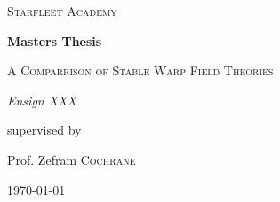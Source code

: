 \begin{titlepage}
	\centering
	{\scshape\Large Starfleet Academy \par}
	\vspace{2cm}
	{\huge\bfseries Masters Thesis\par}
	\vspace{1.5cm}
	{\scshape\Large A Comparrison of Stable Warp Field Theories \par}
	\vspace{1.5cm}
	{\scshape\Large  \par}
	\vspace{2cm}
	{\Large\itshape Ensign XXX\par}
	\vfill
	\vfill
	supervised by\par
	Prof. Zefram \textsc{Cochrane}
	\vfill

	{\large \today \par}
\end{titlepage}
